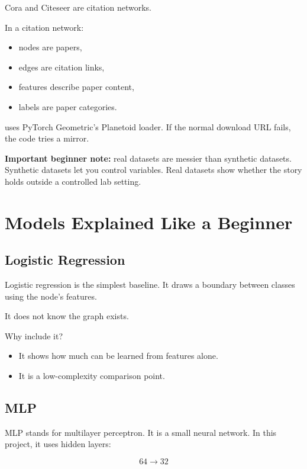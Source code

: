 \documentclass[11pt,a4paper]{article}
\newcommand{\code}[1]{\texttt{\detokenize{#1}}}
\begin{document}
Cora and Citeseer are citation networks.

In a citation network:
\begin{itemize}
  \item nodes are papers,
  \item edges are citation links,
  \item features describe paper content,
  \item labels are paper categories.
\end{itemize}

\code{load_citation} uses PyTorch Geometric's Planetoid loader. If the normal download URL fails, the code tries a mirror.

\textbf{Important beginner note:} real datasets are messier than synthetic datasets. Synthetic datasets let you control variables. Real datasets show whether the story holds outside a controlled lab setting.

\section{Models Explained Like a Beginner}

\subsection{Logistic Regression}

Logistic regression is the simplest baseline. It draws a boundary between classes using the node's features.

It does not know the graph exists.

Why include it?
\begin{itemize}
  \item It shows how much can be learned from features alone.
  \item It is a low-complexity comparison point.
\end{itemize}

\subsection{MLP}

MLP stands for multilayer perceptron. It is a small neural network. In this project, it uses hidden layers:

\[
64 \rightarrow 32
\]
\end{document}
